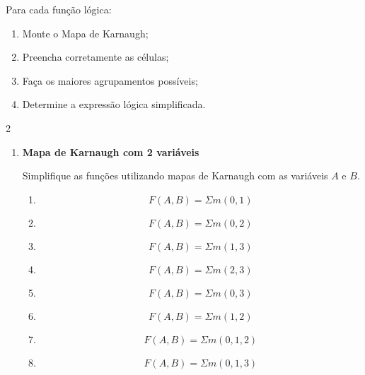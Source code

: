 \documentclass[a4paper,12pt]{article}
\begin{document}
Para cada função lógica:

\begin{enumerate}[label=\alph*)]
    \item Monte o Mapa de Karnaugh;
    \item Preencha corretamente as células;
    \item Faça os maiores agrupamentos possíveis;
    \item Determine a expressão lógica simplificada.
\end{enumerate}

\vspace{0.3cm}


\begin{multicols}{2}
\raggedcolumns

\begin{enumerate}[leftmargin=*]


\item \textbf{Mapa de Karnaugh com 2 variáveis}

Simplifique as funções utilizando mapas de Karnaugh com as variáveis
$A$ e $B$.

\begin{enumerate}[label=(\Alph*)]

    \item
    \[
        F(A,B)=\Sigma m(0,1)
    \]

    \item
    \[
        F(A,B)=\Sigma m(0,2)
    \]

    \item
    \[
        F(A,B)=\Sigma m(1,3)
    \]

    \item
    \[
        F(A,B)=\Sigma m(2,3)
    \]

    \item
    \[
        F(A,B)=\Sigma m(0,3)
    \]

    \item
    \[
        F(A,B)=\Sigma m(1,2)
    \]

    \item
    \[
        F(A,B)=\Sigma m(0,1,2)
    \]

    \item
    \[
        F(A,B)=\Sigma m(0,1,3)
    \]


\end{enumerate}
\end{enumerate}
\end{multicols}
\end{document}
